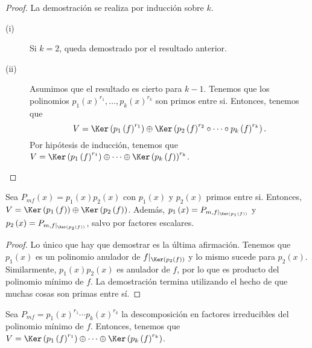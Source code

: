 \begin{proof}
La demostración se realiza por inducción sobre $\displaystyle k $. 
\begin{description}
\item[(i)] Si $\displaystyle k=2 $, queda demostrado por el resultado anterior.
\item[(ii)] Asumimos que el resultado es cierto para $\displaystyle k - 1 $. Tenemos que los polinomios $\displaystyle p_{1}\left(x\right)^{r_{1}}, \ldots, p_{k}\left(x\right)^{r_{k}} $ son primos entre si. Entonces, tenemos que
	\[ V = \Ker\left(p_{1}\left(f\right)^{r_{1}}\right) \oplus \Ker\left(p_{2}\left(f\right)^{r_{2}} \circ \cdots \circ p_{k}\left(f\right)^{r_{k}}\right) .\]
Por hipótesis de inducción, tenemos que $\displaystyle V = \Ker\left(p_{1}\left(f\right)^{r_{1}}\right) \oplus \cdots \oplus \Ker\left(p_{k}\left(f\right)\right)^{r_{k}} $.
\end{description}
\end{proof}
\begin{fprop}[]
\normalfont Sea $\displaystyle P_{mf}\left(x\right) = p_{1}\left(x\right)p_{2}\left(x\right) $ con $\displaystyle p_{1}\left(x\right) $ y $\displaystyle p_{2}\left(x\right) $ primos entre si. Entonces, $\displaystyle V = \Ker\left(p_{1}\left(f\right)\right) \oplus \Ker\left(p_{2}\left(f\right)\right) $. Además, $\displaystyle p_{1}\left(x\right) = P_{m, f|_{\Ker\left(p_{1}\left(f\right)\right)}} $ y $\displaystyle p_{2}\left(x\right) = P_{m,f|_{\Ker\left(p_{2}\left(f\right)\right)}} $, salvo por factores escalares.
\end{fprop}
\begin{proof}
Lo único que hay que demostrar es la última afirmación. Tenemos que $\displaystyle p_{1}\left(x\right) $ es un polinomio anulador de $\displaystyle f|_{\Ker\left(p_{2}\left(f\right)\right)} $ y lo mismo sucede para $\displaystyle p_{2}\left(x\right) $. Similarmente, $\displaystyle p_{1}\left(x\right)p_{2}\left(x\right) $ es anulador de $\displaystyle f $, por lo que es producto del polinomio mínimo de $\displaystyle f $. La demostración termina utilizando el hecho de que muchas cosas son primas entre sí.
\end{proof}
\begin{fprop}[]
\normalfont Sea $\displaystyle P_{mf} = p_{1}\left(x\right)^{r_{1}}\cdots p_{k}\left(x\right)^{r_{k}} $ la descomposición en factores irreducibles del polinomio mínimo de $\displaystyle f $. Entonces, tenemos que $\displaystyle V = \Ker\left(p_{1}\left(f\right)^{r_{1}}\right) \oplus \cdots \oplus \Ker\left(p_{k}\left(f\right)^{r_{k}}\right) $.
\end{fprop}
